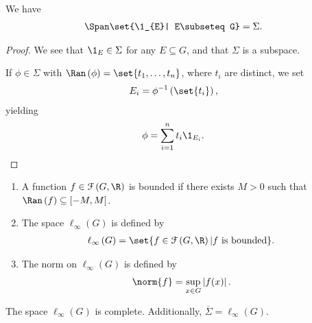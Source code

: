 \begin{fact}
  We have
  \begin{align*}
    \Span\set{\1_{E}| E\subseteq G} &= \Sigma.
  \end{align*}
\end{fact}
\begin{proof}
  We see that $\1_{E}\in \Sigma$ for any $E\subseteq G$, and that $\Sigma$ is a subspace.\newline

  If $\phi\in \Sigma$ with $\Ran\left(\phi\right) = \set{t_1,\dots,t_n}$, where $t_i$ are distinct, we set
  \begin{align*}
    E_i &= \phi^{-1}\left(\set{t_i}\right),
  \end{align*}
  yielding
  \begin{align*}
    \phi &= \sum_{i=1}^{n}t_i\1_{E_i}.
  \end{align*}
\end{proof}
\begin{definition}
  \begin{enumerate}[(1)]
    \item A function $f\in \mathcal{F}\left(G,\R\right)$ is bounded if there exists $M > 0$ such that $\Ran\left(f\right) \subseteq \left[-M,M\right]$.
    \item The space $\ell_{\infty}\left(G\right)$ is defined by
      \begin{align*}
        \ell_{\infty}\left(G\right) &= \set{f\in \mathcal{F}\left(G,\R\right)| f\text{ is bounded}}.
      \end{align*}
    \item The norm on $\ell_{\infty}\left(G\right)$ is defined by
      \begin{align*}
        \norm{f} &= \sup_{x\in G}\left\vert f(x) \right\vert.
      \end{align*}
  \end{enumerate}
\end{definition}
\begin{proposition}
  The space $\ell_{\infty}(G)$ is complete. Additionally, $\overline{\Sigma} = \ell_{\infty}\left(G\right)$.
\end{proposition}

